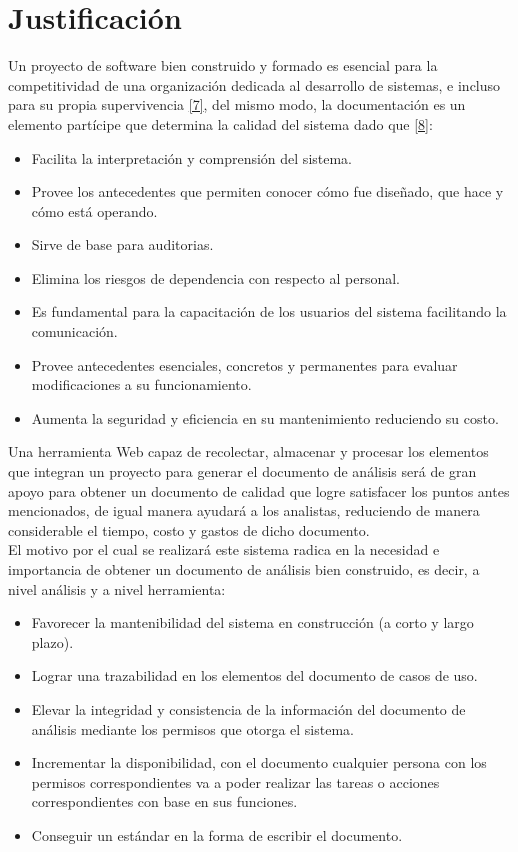 
\section{Justificación}
Un proyecto de software bien construido y formado es esencial para la competitividad de una organización dedicada al desarrollo de sistemas, e incluso para su propia supervivencia \hyperlink{b07}{[7]}, del mismo modo, la documentación es un elemento partícipe que determina la calidad del sistema dado que \hyperlink{b08}{[8]}:

\begin{itemize}
	\item Facilita la interpretación y comprensión del sistema.
	\item Provee los antecedentes que permiten conocer cómo fue diseñado, que hace y cómo está operando.
	\item Sirve de base para auditorias.
	\item Elimina los riesgos de dependencia con respecto al personal.
	\item Es fundamental para la capacitación de los usuarios del sistema facilitando la comunicación.
	\item Provee antecedentes esenciales, concretos y permanentes para evaluar modificaciones a su funcionamiento.
	\item Aumenta la seguridad y eficiencia en su mantenimiento reduciendo su costo.
\end{itemize}

Una herramienta Web capaz de recolectar, almacenar y procesar los elementos que integran un proyecto para generar el documento de análisis será de gran apoyo para obtener un documento de calidad que logre satisfacer los puntos antes mencionados, de igual manera ayudará a los analistas, reduciendo de manera considerable el tiempo, costo y gastos de dicho documento.\\

El motivo por el cual se realizará este sistema radica en la necesidad e importancia de obtener un documento de análisis bien construido, es decir, a nivel análisis y a nivel herramienta:

\begin{itemize}
\item Favorecer la mantenibilidad del sistema en construcción (a corto y largo plazo).
\item Lograr una trazabilidad en los elementos del documento de casos de uso.
\item Elevar la integridad y consistencia de la información del documento de análisis mediante los permisos que otorga el sistema.
\item Incrementar la disponibilidad, con el documento cualquier persona con los permisos correspondientes va a poder realizar las tareas o acciones correspondientes con base en sus funciones.
\item Conseguir un estándar en la forma de escribir el documento.
\end{itemize}

